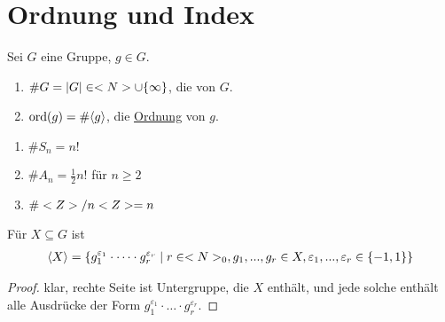 \section{Ordnung und Index}

Sei $G$ eine Gruppe, $g\in G$.

\begin{definition}[Ordnung]
	\begin{enumerate}[label=(\alph*)]
		\item $\#G=\vert G\vert\in<N>\cup\{\infty\}$, die  von $G$.
		\item $\operatorname{ord}(g)=\#\langle g\rangle$, die \underline{Ordnung} von $g$.
	\end{enumerate}
\end{definition}

\begin{example}
	\begin{enumerate}[label=(\alph*)]
		\item $\# S_n=n!$
		\item $\# A_n=\frac{1}{2}n!$ für $n\ge 2$
		\item $\#<Z>/n<Z>=n$
	\end{enumerate}
\end{example}

\begin{lemma}
	Für $X\subseteq G$ ist
	\begin{align}
		\langle X\rangle = \{g_1^{\varepsilon_1}\cdot\dots\cdot g_r^{\varepsilon_r}\mid r\in<N>_0,g_1,...,g_r\in X, \varepsilon_1,...,\varepsilon_r\in\{-1,1\}\}\notag
	\end{align}
\end{lemma}
\begin{proof}
	klar, rechte Seite ist Untergruppe, die $X$ enthält, und jede solche enthält alle Ausdrücke der Form  $g_1^{\varepsilon_1}\cdot\dots\cdot g_r^{\varepsilon_r}$.
\end{proof}

